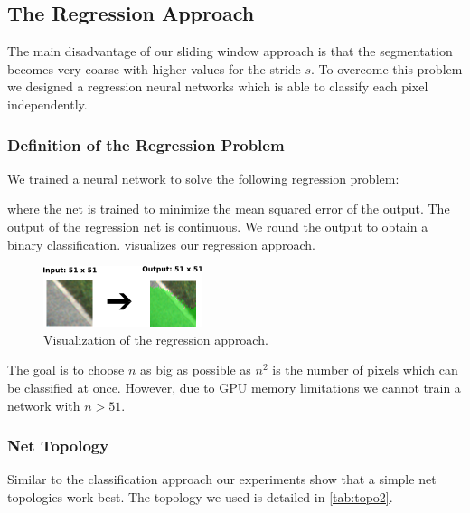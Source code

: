\subsection{The Regression Approach}
The main disadvantage of our sliding window approach is that the segmentation
becomes very coarse with higher values for the stride $s$. To overcome this
problem we designed a regression neural networks which is able to classify each
pixel independently.

\subsubsection{Definition of the Regression Problem}
We trained a neural network to solve the following regression problem:


where the net is trained to minimize the mean squared error of the output. The
output of the regression net is continuous. We round the output to obtain a
binary classification.  visualizes our regression approach.

\begin{figure}[H]
    \centering
    \includegraphics[width=0.5\columnwidth]{figures/models/fully-conv.png}
    \caption{Visualization of the regression approach.}%
\label{fig:reg}
\end{figure}

The goal is to choose $n$ as big as possible as $n^2$ is the number of pixels
which can be classified at once. However, due to GPU memory limitations we
cannot train a network with $n > 51$.


\subsubsection{Net Topology}
Similar to the classification approach our experiments show that a simple net
topologies work best. The topology we used is detailed in \cref{tab:topo2}.

